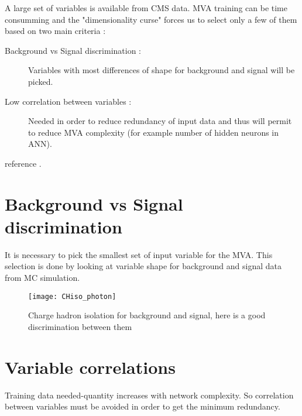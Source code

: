 \label{sec:unchapitre}

A large set of variables is available from CMS data. MVA training can be time consumming and the "dimensionality curse" forces us to select only a few of them based on two main criteria :
\begin{description}
    \item [Background vs Signal discrimination :] Variables with most differences of shape for background and signal will be picked.
    \item [Low correlation between variables :] Needed in order to reduce redundancy of input data and thus will permit
    to reduce MVA complexity (for example number of hidden neurons in ANN).
\end{description}

reference \cite{CMS2015}.

\section{Background vs Signal discrimination}

It is necessary to pick the smallest set of input variable for the MVA. This selection is done by looking at variable shape for background and signal data from MC simulation.

\begin{figure}[ht]
  \centering
  \texttt{[image: CHiso\_photon]}\\[1cm]
  \caption{Charge hadron isolation for background and signal, here is a good discrimination between them}
  \label{fig:une-image}
\end{figure}


\section{Variable correlations}

Training data needed-quantity increases with network complexity. So correlation between variables must be avoided in order to get the minimum redundancy.

